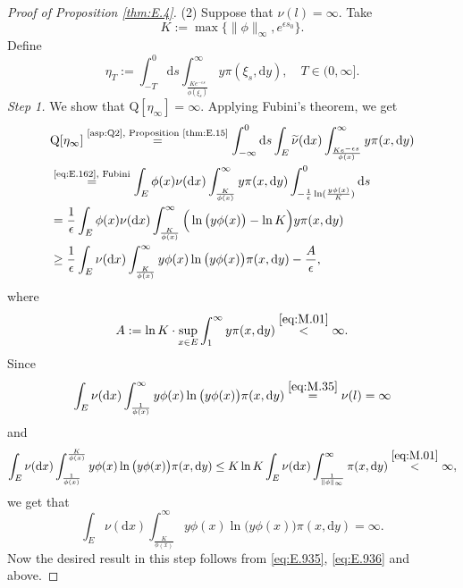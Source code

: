 \documentclass[12pt,a4paper]{amsart}
\numberwithin{equation}{section}
\theoremstyle{plain}
\theoremstyle{definition}
\theoremstyle{remark}
\begin{document}
\begin{proof}[Proof of Proposition \ref{thm:E.4}]
	
	(2) Suppose that $\nu(l)=\infty$.
	Take
\begin{equation} \label{eq:E.934}
	K
	:= \max \{\|\phi\|_\infty,e^{\epsilon s_0}\}.
\end{equation}
	Define
\begin{equation}\label{eq:E.9341}
	\eta_T
	:= \int_{-T}^{0} \mathrm ds \int_{\frac{Ke^{-\epsilon s}}{\phi(\xi_s)}}^\infty y\pi(\xi_s,\mathrm dy),
	\quad T \in (0,\infty].
\end{equation}
	\emph{Step 1.} We show that $\mathrm Q[\eta_\infty]=\infty.$
	Applying Fubini's theorem, we get
\begin{align}
	&\mathrm Q[\eta_\infty]
	\overset{\text{\eqref{asp:Q2}, Proposition \ref{thm:E.15}}}= \int_{-\infty}^{0} \mathrm ds \int_E \widetilde\nu(\mathrm dx) \int_{\frac{Ke^{-\epsilon s}}{\phi(x)}}^\infty y\pi(x, \mathrm dy)
	\\ &\overset{\text{\eqref{eq:E.162}, Fubini}}= \int_E\phi(x)\nu(\mathrm dx)\int_{\frac{K}{\phi(x)}}^\infty y\pi(x, \mathrm dy)\int_{-\frac{1}{\epsilon}\ln(\frac{y\phi(x)}{K})}^0\mathrm ds
	\\&=\frac{1}{\epsilon}\int_E\phi(x)\nu(\mathrm dx)\int_{\frac{K}{\phi(x)}}^\infty\Big(\ln\big(y\phi(x)\big)-\ln K\Big)y\pi(x, \mathrm dy)
	\\\label{eq:E.935}&\geq \frac{1}{\epsilon}\int_E\nu(\mathrm dx) \int_{\frac{K}{\phi(x)}}^\infty y\phi(x)\ln \big(y\phi(x)\big)\pi(x, \mathrm dy)-\frac{A}{\epsilon},
\end{align}
	where
\begin{equation} \label{eq:E.936}
	A
	:= \ln K \cdot \sup_{x\in E} \int_1^\infty y \pi(x,\mathrm dy)
	\overset{\eqref{eq:M.01}}< \infty.
\end{equation}
	Since
\[
	\int_E\nu(\mathrm dx) \int_{\frac{1}{\phi(x)}}^\infty y\phi(x)\ln \big(y\phi(x)\big)\pi(x, \mathrm dy)
	\overset{\eqref{eq:M.35}}= \nu(l)
	=\infty
\]
	and
\begin{align}
	\int_E\nu(\mathrm dx) \int_{\frac{1}{\phi(x)}}^{\frac{K}{\phi(x)}} y\phi(x)\ln \big(y\phi(x)\big)\pi(x, \mathrm dy)
	\leq K \ln K \int_E \nu(\mathrm dx) \int_{\frac{1}{\|\phi\|_\infty}}^\infty \pi(x, \mathrm dy)
	\overset{\eqref{eq:M.01}}<\infty,
\end{align}
	we get that
\begin{equation}
	\int_E\nu(\mathrm dx) \int_{\frac{K}{\phi(x)}}^\infty y\phi(x)\ln \big(y\phi(x)\big)\pi(x, \mathrm dy)
	= \infty.
\end{equation}
	Now the desired result in this step follows from \eqref{eq:E.935}, \eqref{eq:E.936} and above.
	

\end{proof}
\end{document}
